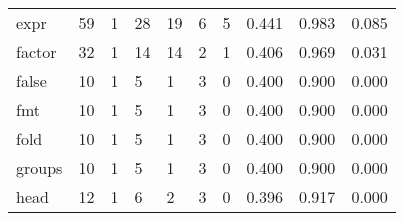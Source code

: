 \begin{longtable}{lp{1.3cm}p{1.3cm}p{1.3cm}p{1.3cm}p{1.3cm}p{1.3cm}p{1.3cm}p{1.3cm}p{1.3cm}}
expr      &                     59 &                                             1 &                                           28 &                                          19 &                                            6 &                                          5 &                                0.441 &                                  0.983 &                                0.085 \\
factor    &                     32 &                                             1 &                                           14 &                                          14 &                                            2 &                                          1 &                                0.406 &                                  0.969 &                                0.031 \\
false     &                     10 &                                             1 &                                            5 &                                           1 &                                            3 &                                          0 &                                0.400 &                                  0.900 &                                0.000 \\
fmt       &                     10 &                                             1 &                                            5 &                                           1 &                                            3 &                                          0 &                                0.400 &                                  0.900 &                                0.000 \\
fold      &                     10 &                                             1 &                                            5 &                                           1 &                                            3 &                                          0 &                                0.400 &                                  0.900 &                                0.000 \\
groups    &                     10 &                                             1 &                                            5 &                                           1 &                                            3 &                                          0 &                                0.400 &                                  0.900 &                                0.000 \\
head      &                     12 &                                             1 &                                            6 &                                           2 &                                            3 &                                          0 &                                0.396 &                                  0.917 &                                0.000 \\

\end{longtable}
